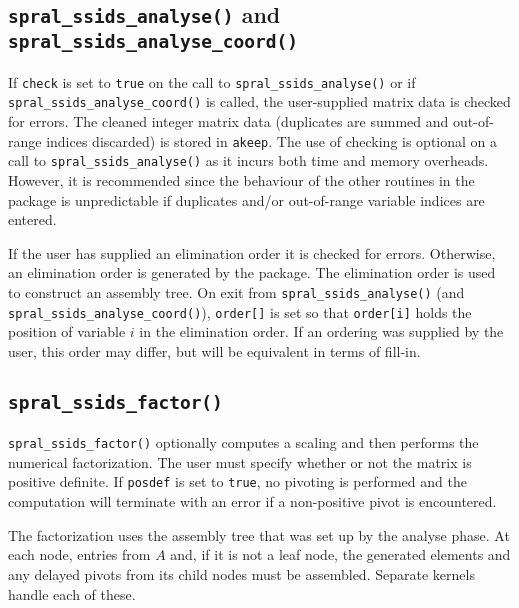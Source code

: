 \subsection*{\texttt{spral\_ssids\_analyse()} and \texttt{spral\_ssids\_analyse\_coord()}}
If {\tt check} is set to {\tt true} on the call to {\tt spral\_ssids\_analyse()}
or if {\tt spral\_ssids\_analyse\_coord()} is called, 
the user-supplied matrix data is checked for errors. The cleaned integer matrix data
(duplicates are summed and out-of-range indices discarded) is stored in
{\tt akeep}.
The use of checking is optional on a call to {\tt spral\_ssids\_analyse()} as it
incurs both time and memory overheads. However, it is recommended
since the behaviour of the other routines in the package
is unpredictable if duplicates and/or out-of-range variable indices are entered.

If the user has supplied an elimination order it is checked for errors. Otherwise,
an elimination order is generated by the package. 
The elimination order is used to construct an assembly tree.
On exit from {\tt spral\_ssids\_analyse()} (and {\tt spral\_ssids\_analyse\_coord()}), 
{\tt order[]} is set so that {\tt order[i]} holds the position
of variable $i$ in the elimination order. If an ordering was supplied by the user, this
order may differ, but will be equivalent in terms of fill-in.


\subsection*{\texttt{spral\_ssids\_factor()}}
{\tt spral\_ssids\_factor()} optionally computes a scaling and then performs the numerical factorization.
 The user must specify whether or not the matrix is
positive definite. If {\tt posdef} is set to {\tt true}, no pivoting
is performed and the computation will terminate with an error if a
non-positive pivot is encountered.

The factorization uses the assembly tree that was set up by the analyse phase.
At each  node,  entries from $A$ and, if it is not a leaf node,
the generated elements and any delayed pivots from its child nodes
must be assembled. Separate kernels handle each of these.


